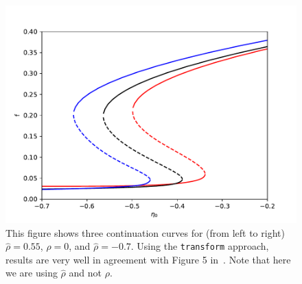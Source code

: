 \documentclass[bibliography=totoc, twoside]{article}
\numberwithin{equation}{section}
\begin{document}
\begin{figure}
    \centering
    \includegraphics[width=.8\linewidth]{eta_0_continuation.pdf}
    \caption{This figure shows three continuation curves for (from left to right) $\hat{\rho}=0.55$, $\hat{\rho}=0$, and $\hat{\rho}=-0.7$.
    Using the \texttt{transform} approach, results are very well in agreement with Figure 5 in~\cite{laing2019}.
    Note that here we are using $\hat{\rho}$ and not $\rho$.}
    \label{fig:thetanet:eta_0_continuation}
\end{figure}
\end{document}
